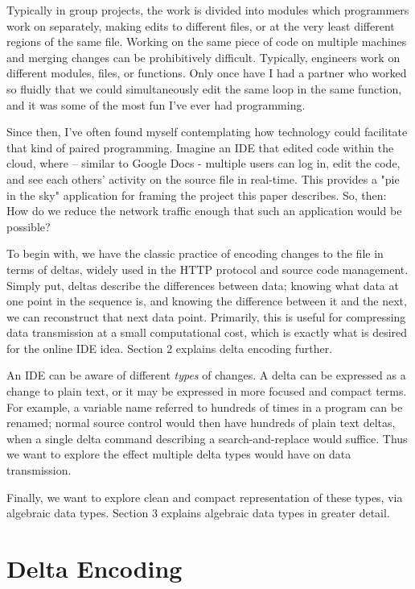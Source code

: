 \documentclass[12pt,a4paper]{article}
\begin{document}
	Typically in group projects, the work is divided into modules which programmers work on separately, making edits to different files, or at the very least different regions of the same file. Working on the same piece of code on multiple machines and merging changes can be prohibitively difficult. Typically, engineers work on different modules, files, or functions. Only once have I had a partner who worked so fluidly that we could simultaneously edit the same loop in the same function, and it was some of the most fun I've ever had programming.
	
	Since then, I've often found myself contemplating how technology could facilitate that kind of paired programming. Imagine an IDE that edited code within the cloud, where -- similar to Google Docs -  multiple users can log in, edit the code, and see each others' activity on the source file in real-time. This provides a "pie in the sky" application for framing the project this paper describes. So, then: How do we reduce the network traffic enough that such an application would be possible?
	
	To begin with, we have the classic practice of encoding changes to the file in terms of deltas, widely used in the HTTP protocol\cite{BenefitsDeltaEncodingHTTP,DeltaEncodingHTTP} and source code management. Simply put, deltas describe the differences between data; knowing what data at one point in the sequence is, and knowing the difference between it and the next, we can reconstruct that next data point. Primarily, this is useful for compressing data transmission at a small computational cost, which is exactly what is desired for the online IDE idea. Section 2 explains delta encoding further.
	
	An IDE can be aware of different \textit{types} of changes. A delta can be expressed as a change to plain text, or it may be expressed in more focused and compact terms. For example, a variable name referred to hundreds of times in a program can be renamed; normal source control would then have hundreds of plain text deltas, when a single delta command describing a search-and-replace would suffice. Thus we want to explore the effect multiple delta types would have on data transmission.
	
	Finally, we want to explore clean and compact representation of these types, via algebraic data types. Section 3 explains algebraic data types in greater detail.
	
	\section{Delta Encoding}
		
\end{document}
